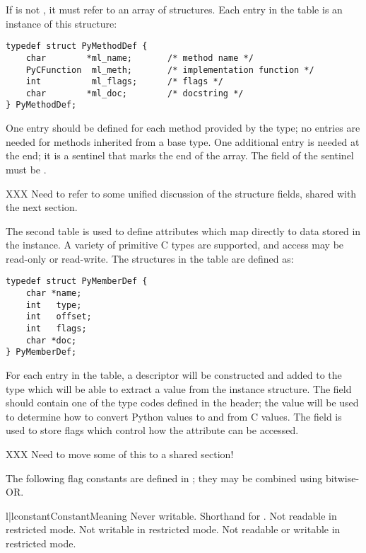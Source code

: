 If  is not \NULL, it must refer to an array of
 structures.  Each entry in the table is an
instance of this structure:

\begin{verbatim}
typedef struct PyMethodDef {
    char        *ml_name;       /* method name */
    PyCFunction  ml_meth;       /* implementation function */
    int	         ml_flags;      /* flags */
    char        *ml_doc;        /* docstring */
} PyMethodDef;
\end{verbatim}

One entry should be defined for each method provided by the type; no
entries are needed for methods inherited from a base type.  One
additional entry is needed at the end; it is a sentinel that marks the
end of the array.  The  field of the sentinel must be
\NULL.

XXX Need to refer to some unified discussion of the structure fields,
shared with the next section.

The second table is used to define attributes which map directly to
data stored in the instance.  A variety of primitive C types are
supported, and access may be read-only or read-write.  The structures
in the table are defined as:

\begin{verbatim}
typedef struct PyMemberDef {
    char *name;
    int   type;
    int   offset;
    int   flags;
    char *doc;
} PyMemberDef;
\end{verbatim}

For each entry in the table, a descriptor will be constructed and
added to the type which will be able to extract a value from the
instance structure.  The  field should contain one of the
type codes defined in the  header; the value will
be used to determine how to convert Python values to and from C
values.  The  field is used to store flags which control
how the attribute can be accessed.

XXX Need to move some of this to a shared section!

The following flag constants are defined in ;
they may be combined using bitwise-OR.

\begin{tableii}{l|l}{constant}{Constant}{Meaning}
         {Never writable.}
         {Shorthand for .}
         {Not readable in restricted mode.}
         {Not writable in restricted mode.}
         {Not readable or writable in restricted mode.}
\end{tableii}

